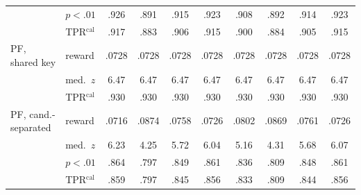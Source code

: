\documentclass{article} %
\begin{document}
\begin{table}[h]
\begin{center}
\begin{tabular}{llcccccccc}
 & $p{<}.01$ & .926 & .891 & .915 & .923 & .908 & .892 & .914 & .923 \\
 & TPR$^{\mathrm{cal}}$ & .917 & .883 & .906 & .915 & .900 & .884 & .905 & .915 \\
\midrule
PF, shared key & reward & .0728 & .0728 & .0728 & .0728 & .0728 & .0728 & .0728 & .0728 \\
 & med.\ $z$ & 6.47 & 6.47 & 6.47 & 6.47 & 6.47 & 6.47 & 6.47 & 6.47 \\
 & TPR$^{\mathrm{cal}}$ & .930 & .930 & .930 & .930 & .930 & .930 & .930 & .930 \\
\midrule
PF, cand.-separated & reward & .0716 & .0874 & .0758 & .0726 & .0802 & .0869 & .0761 & .0726 \\
 & med.\ $z$ & 6.23 & 4.25 & 5.72 & 6.04 & 5.16 & 4.31 & 5.68 & 6.07 \\
 & $p{<}.01$ & .864 & .797 & .849 & .861 & .836 & .809 & .848 & .861 \\
 & TPR$^{\mathrm{cal}}$ & .859 & .797 & .845 & .856 & .833 & .809 & .844 & .856 \\
\bottomrule
\end{tabular}
\end{center}
\end{table}
\end{document}
